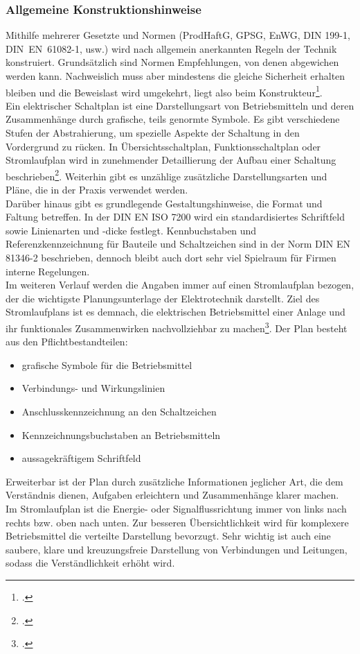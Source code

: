 \documentclass[12pt,a4paper]{scrartcl}	%
\begin{document}
\subsubsection{Allgemeine Konstruktionshinweise}
Mithilfe mehrerer Gesetzte und Normen (ProdHaftG, GPSG, EnWG, DIN 199-1,\\ \mbox{DIN EN 61082-1}, usw.) wird nach allgemein anerkannten Regeln der Technik konstruiert. Grundsätzlich sind Normen \glqq Empfehlungen\grqq, von denen abgewichen werden kann. Nachweislich muss aber mindestens die gleiche Sicherheit erhalten bleiben und die Beweislast wird umgekehrt, liegt also beim Konstrukteur\footcite[vgl.][S. 10 \psq]{grund}.\\
Ein elektrischer Schaltplan ist eine Darstellungsart von Betriebsmitteln und deren Zusammenhänge durch grafische, teils genormte Symbole. Es gibt verschiedene Stufen der Abstrahierung, um spezielle Aspekte der Schaltung in den Vordergrund zu rücken. In Übersichtsschaltplan, Funktionsschaltplan oder Stromlaufplan wird in zunehmender Detaillierung der Aufbau einer Schaltung beschrieben\footcite[vgl.][S. 162 \psqq]{pneu}. Weiterhin gibt es unzählige zusätzliche Darstellungsarten und Pläne, die in der Praxis verwendet werden.\\
Darüber hinaus gibt es grundlegende Gestaltungshinweise, die Format und Faltung betreffen. In der DIN EN ISO 7200 wird ein standardisiertes Schriftfeld sowie Linienarten und -dicke festlegt. Kennbuchstaben und Referenzkennzeichnung für Bauteile und Schaltzeichen sind in der Norm DIN EN 81346-2 beschrieben, dennoch bleibt auch dort sehr viel Spielraum für Firmen interne Regelungen.\\
Im weiteren Verlauf werden die Angaben immer auf einen Stromlaufplan bezogen, der die wichtigste Planungsunterlage der Elektrotechnik darstellt.
Ziel des Stromlaufplans ist es demnach, die elektrischen Betriebsmittel einer Anlage und ihr funktionales Zusammenwirken nachvollziehbar zu machen\footcite[vgl.][S. 34 \psqq]{grund}. Der Plan besteht aus den Pflichtbestandteilen:
\begin{itemize}
	\item grafische Symbole für die Betriebsmittel
	\item Verbindungs- und Wirkungslinien
	\item Anschlusskennzeichnung an den Schaltzeichen
	\item Kennzeichnungsbuchstaben an Betriebsmitteln
	\item aussagekräftigem Schriftfeld
\end{itemize}
Erweiterbar ist der Plan durch zusätzliche Informationen jeglicher Art, die dem Verständnis dienen, Aufgaben erleichtern und Zusammenhänge klarer machen.\\
Im Stromlaufplan ist die Energie- oder Signalflussrichtung immer von links nach rechts bzw. oben nach unten. Zur besseren Übersichtlichkeit wird für komplexere Betriebsmittel die verteilte Darstellung bevorzugt. Sehr wichtig ist auch eine saubere, klare und kreuzungsfreie Darstellung von Verbindungen und Leitungen, sodass die Verständlichkeit erhöht wird.
\end{document}
